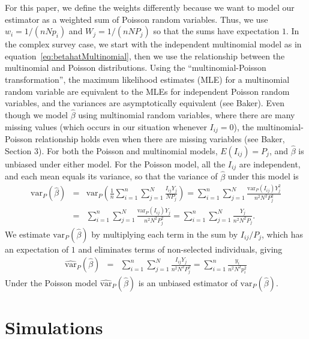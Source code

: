 For this paper, we define the weights differently because we want to model our estimator as a weighted sum of Poisson random variables.
Thus, we use $w_i = 1/(nNp_i)$ and $W_j= 1/(nNP_j)$ so that the sums have expectation $1$.
In the complex survey case,
we start with the independent multinomial model as in equation~\ref{eq:betahatMultinomial}, then we use the relationship between the multinomial and Poisson distributions.
Using the ``multinomial-Poisson transformation'', the maximum
likelihood estimates (MLE) for a multinomial random variable are equivalent to the MLEs for independent Poisson random variables, and
the variances are asymptotically equivalent (see Baker\cite{Baker:1994}).
Even though we model $\hat{\beta}$ using multinomial random variables, where there are many missing values (which occurs in our situation whenever $I_{ij}=0$),
the multinomial-Poisson relationship holds even when there are missing variables (see Baker\cite{Baker:1994}, Section 3).
For both the Poisson and multinomial models, $E(I_{ij}) = P_j$, and $\hat{\beta}$ is unbiased under either model.
For the Poisson model, all the $I_{ij}$ are independent, and each mean equals its variance, so that the variance of $\hat{\beta}$ under this model is
\begin{eqnarray*}
\textrm{var}_P \left(\hat{\beta} \right) & = & \textrm{var}_P \left( \frac{1}{n} \sum_{i=1}^{n} \sum_{j=1}^{N} \frac{ I_{ij} Y_j}{N P_j} \right)
 = \sum_{i=1}^{n} \sum_{j=1}^{N} \frac{ \textrm{var}_P( I_{ij}) Y_j^2}{n^2 N^2 P_j^2} \\
& = & \sum_{i=1}^{n} \sum_{j=1}^{N} \frac{ \textrm{var}_P( I_{ij}) Y_j}{n^2 N^2 P_j^2}
 =     \sum_{i=1}^{n} \sum_{j=1}^{N} \frac{ Y_j}{n^2 N^2 P_j}.
\end{eqnarray*}
We estimate $\textrm{var}_P \left(\hat{\beta} \right)$ by multiplying each term in the sum by $I_{ij}/P_j$, which has an expectation of $1$ and eliminates terms of non-selected individuals, giving
\begin{eqnarray}
\widehat{\textrm{var}}_P \left(\hat{\beta} \right)
& = & \sum_{i=1}^{n} \sum_{j=1}^{N} \frac{ I_{ij} Y_j}{n^2 N^2 P_j^2} = \sum_{i=1}^{n} \frac{ y_i}{n^2 N^2 p_i^2} \label{eq:hatvarbetahat1}
\end{eqnarray}
Under the Poisson model $\widehat{\textrm{var}}_P \left(\hat{\beta} \right)$ is an unbiased estimator of $\textrm{var}_P \left(\hat{\beta} \right)$.



\section{Simulations}

